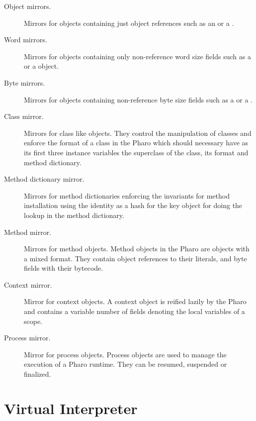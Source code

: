 \begin{description}
\item[Object mirrors.] Mirrors for objects containing just object references such as an  or a .
\item[Word mirrors.] Mirrors for objects containing only non-reference word size fields such as a  or a  object.
\item[Byte mirrors.] Mirrors for objects containing non-reference byte size fields such as a  or a . 
\item[Class mirror.] Mirrors for class like objects. They control the manipulation of classes and enforce the format of a class in the Pharo \VM which should necessary have as its first three instance variables the superclass of the class, its format and method dictionary.
\item[Method dictionary mirror.] Mirrors for method dictionaries enforcing the \VM invariants for method installation \ie using the identity as a hash for the key object for doing the lookup in the method dictionary.
\item[Method mirror.] Mirrors for method objects. Method objects in the Pharo \VM are objects with a mixed format. They contain object references to their literals, and byte fields with their bytecode.
\item[Context mirror.] Mirror for context objects. A context object is reified lazily by the Pharo \VM and contains a variable number of fields denoting the local variables of a scope.
\item[Process mirror.] Mirror for process objects. Process objects are used to manage the execution of a Pharo runtime. They can be resumed, suspended or finalized.
\end{description}



\section{\Vtt Virtual Interpreter}%

